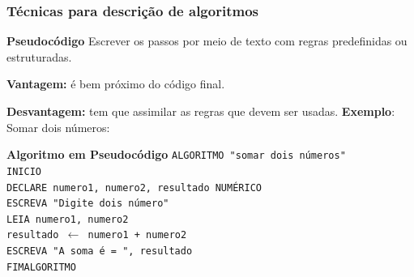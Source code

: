 \begin{frame}
	\frametitle{Técnicas para descrição de algoritmos}
	
	\begin{block}{\textbf{Pseudocódigo}}
		Escrever os passos por meio de texto com regras predefinidas ou estruturadas.
	\end{block}
	
	\textbf{Vantagem:} é bem próximo do código final.
	
	\textbf{Desvantagem:} tem que assimilar as regras que devem ser usadas.
	\textbf{Exemplo}: Somar dois números:

	\begin{block}{\textbf{Algoritmo em Pseudocódigo}}
		\texttt{ALGORITMO "somar dois números"}\\
		\texttt{INICIO}\\
		\texttt{DECLARE numero1, numero2, resultado NUMÉRICO}\\
		\texttt{ESCREVA "Digite dois número"}\\
		\texttt{LEIA numero1, numero2}\\
		\texttt{resultado $\leftarrow$ numero1 + numero2}\\
		\texttt{ESCREVA "A soma é = ", resultado}\\
		\texttt{FIMALGORITMO}
	\end{block}

\end{frame}





